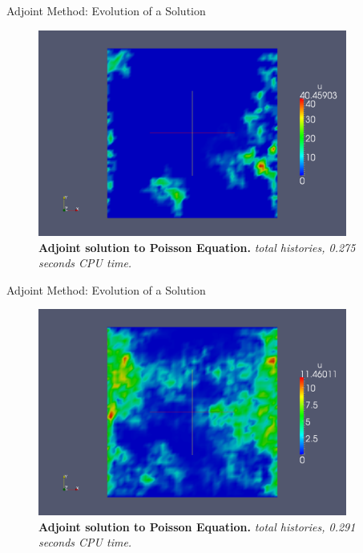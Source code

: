 \documentclass{beamer}
\begin{document}
\begin{frame}{Adjoint Method: Evolution of a Solution}

  \begin{figure}[h!]
    \begin{center}
      \includegraphics[width=4in]{../../prelim/presentation/adjoint_100.png}
    \end{center}
    \caption{\textbf{Adjoint solution to Poisson Equation.}
      \textit{ total histories, 0.275 seconds CPU time.} }
  \end{figure}

\end{frame}

\begin{frame}{Adjoint Method: Evolution of a Solution}

  \begin{figure}[h!]
    \begin{center}
      \includegraphics[width=4in]{../../prelim/presentation/adjoint_1000.png}
    \end{center}
    \caption{\textbf{Adjoint solution to Poisson Equation.}
      \textit{ total histories, 0.291 seconds CPU time.} }
  \end{figure}

\end{frame}
\end{document}
